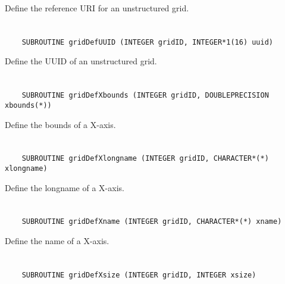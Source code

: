 Define the reference URI for an unstructured grid.


\section*{\tt {}}

\begin{verbatim}
    SUBROUTINE gridDefUUID (INTEGER gridID, INTEGER*1(16) uuid)
\end{verbatim}

Define the UUID of an unstructured grid.


\section*{\tt {}}

\begin{verbatim}
    SUBROUTINE gridDefXbounds (INTEGER gridID, DOUBLEPRECISION xbounds(*))
\end{verbatim}

Define the bounds of a X-axis.


\section*{\tt {}}

\begin{verbatim}
    SUBROUTINE gridDefXlongname (INTEGER gridID, CHARACTER*(*) xlongname)
\end{verbatim}

Define the longname of a X-axis.


\section*{\tt {}}

\begin{verbatim}
    SUBROUTINE gridDefXname (INTEGER gridID, CHARACTER*(*) xname)
\end{verbatim}

Define the name of a X-axis.


\section*{\tt {}}

\begin{verbatim}
    SUBROUTINE gridDefXsize (INTEGER gridID, INTEGER xsize)
\end{verbatim}


